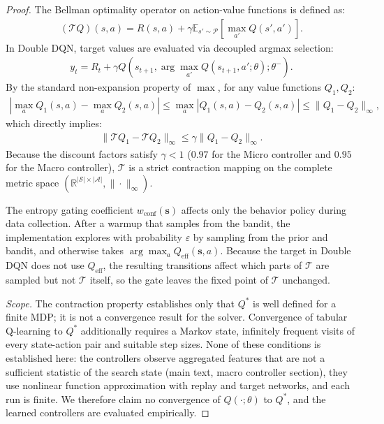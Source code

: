 \documentclass{article}
\begin{document}
\begin{proof}
The Bellman optimality operator on action-value functions is defined as:
\begin{align}
(\mathcal{T} Q)(s, a) = R(s, a) + \gamma \mathbb{E}_{s' \sim \mathcal{P}} \left[ \max_{a'} Q(s', a') \right].
\end{align}
In Double DQN, target values are evaluated via decoupled argmax selection:
\begin{align}
y_t = R_t + \gamma Q(s_{t+1}, \arg\max_{a'} Q(s_{t+1}, a'; \theta); \theta^-).
\end{align}
By the standard non-expansion property of $\max$, for any value functions $Q_1, Q_2$:
\begin{align}
\left| \max_{a} Q_1(s, a) - \max_{a} Q_2(s, a) \right| \le \max_a |Q_1(s, a) - Q_2(s, a)| \le \|Q_1 - Q_2\|_\infty,
\end{align}
which directly implies:
\begin{align}
\|\mathcal{T} Q_1 - \mathcal{T} Q_2\|_\infty \le \gamma \|Q_1 - Q_2\|_\infty.
\end{align}
Because the discount factors satisfy $\gamma < 1$ ($0.97$ for the Micro controller and $0.95$ for the Macro controller), $\mathcal{T}$ is a strict contraction mapping on the complete metric space $(\mathbb{R}^{|\mathcal{S}| \times |\mathcal{A}|}, \|\cdot\|_\infty)$.

The entropy gating coefficient $w_{\text{conf}}(\mathbf{s})$ affects only the behavior policy during data collection. After a warmup that samples from the bandit, the implementation explores with probability $\varepsilon$ by sampling from the prior and bandit, and otherwise takes $\arg\max_a Q_{\text{eff}}(\mathbf{s}, a)$. Because the target in Double DQN does not use $Q_{\text{eff}}$, the resulting transitions affect which parts of $\mathcal{T}$ are sampled but not $\mathcal{T}$ itself, so the gate leaves the fixed point of $\mathcal{T}$ unchanged.

\emph{Scope.} The contraction property establishes only that $Q^*$ is well defined for a finite MDP; it is not a convergence result for the solver. Convergence of tabular Q-learning to $Q^*$ additionally requires a Markov state, infinitely frequent visits of every state-action pair and suitable step sizes. None of these conditions is established here: the controllers observe aggregated features that are not a sufficient statistic of the search state (main text, macro controller section), they use nonlinear function approximation with replay and target networks, and each run is finite. We therefore claim no convergence of $Q(\cdot; \theta)$ to $Q^*$, and the learned controllers are evaluated empirically.
\end{proof}
\end{document}
